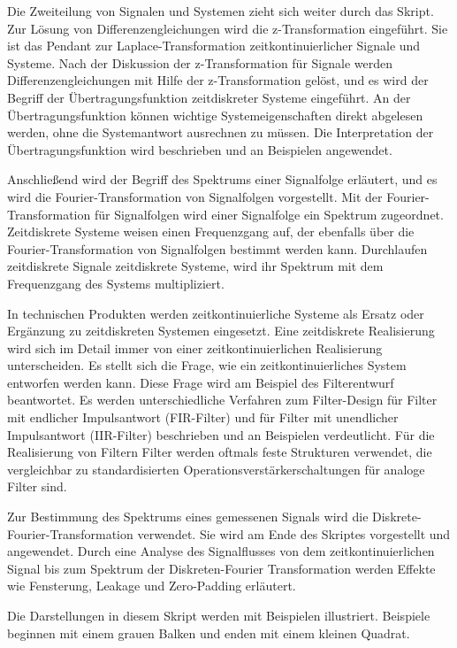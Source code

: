 Die Zweiteilung von Signalen und Systemen zieht sich weiter durch das Skript. Zur Lösung von Differenzengleichungen wird die z-Transformation eingeführt. Sie ist das Pendant zur Laplace-Transformation zeitkontinuierlicher Signale und Systeme. Nach der Diskussion der z-Transformation für Signale werden Differenzengleichungen mit Hilfe der z-Transformation gelöst, und es wird der Begriff der Übertragungsfunktion zeitdiskreter Systeme eingeführt. An der Übertragungsfunktion können wichtige Systemeigenschaften direkt abgelesen werden, ohne die Systemantwort ausrechnen zu müssen. Die Interpretation der Übertragungsfunktion wird beschrieben und an Beispielen angewendet.

Anschließend wird der Begriff des Spektrums einer Signalfolge erläutert, und es wird die Fourier-Transformation von Signalfolgen vorgestellt. Mit der Fourier-Transformation für Signalfolgen wird einer Signalfolge ein Spektrum zugeordnet. Zeitdiskrete Systeme weisen einen Frequenzgang auf, der ebenfalls über die Fourier-Transformation von Signalfolgen bestimmt werden kann. Durchlaufen zeitdiskrete Signale zeitdiskrete Systeme, wird ihr Spektrum mit dem Frequenzgang des Systems multipliziert.

In technischen Produkten werden zeitkontinuierliche Systeme als Ersatz oder Ergänzung zu zeitdiskreten Systemen eingesetzt. Eine zeitdiskrete Realisierung wird sich im Detail immer von einer zeitkontinuierlichen Realisierung unterscheiden. Es stellt sich die Frage, wie ein zeitkontinuierliches System entworfen werden kann. Diese Frage wird am Beispiel des Filterentwurf beantwortet. Es werden unterschiedliche Verfahren zum Filter-Design für Filter mit endlicher Impulsantwort (FIR-Filter) und für Filter mit unendlicher Impulsantwort (IIR-Filter) beschrieben und an Beispielen verdeutlicht. Für die Realisierung von Filtern Filter werden oftmals feste Strukturen verwendet, die vergleichbar zu standardisierten Operationsverstärkerschaltungen für analoge Filter sind.

Zur Bestimmung des Spektrums eines gemessenen Signals wird die Diskrete-Fourier-Transformation verwendet. Sie wird am Ende des Skriptes vorgestellt und angewendet. Durch eine Analyse des Signalflusses von dem zeitkontinuierlichen Signal bis zum Spektrum der Diskreten-Fourier Transformation werden Effekte wie Fensterung, Leakage und Zero-Padding erläutert.

Die Darstellungen in diesem Skript werden mit Beispielen illustriert. Beispiele beginnen mit einem grauen Balken und enden mit einem kleinen Quadrat.

